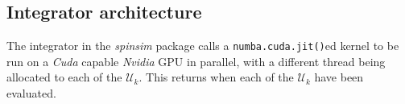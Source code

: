 \documentclass{jors}
\begin{document}

		

		
		

	\subsection{Integrator architecture}
		The integrator in the \emph{spinsim} package calls a \texttt{numba.cuda.jit()}ed kernel to be run on a \emph{Cuda} capable \emph{Nvidia} GPU in parallel, with a different thread being allocated to each of the \(\mathcal{U}_k\).
		This returns when each of the \(\mathcal{U}_k\) have been evaluated.
		
\end{document}
